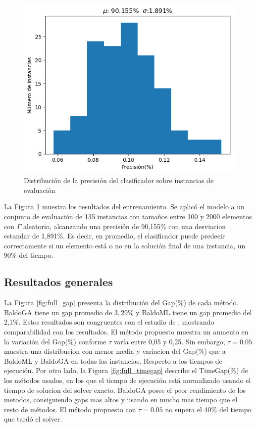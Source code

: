 \documentclass[spanish, a4paper, 12pt, openany,final]{book}
\begin{document}
\begin{figure}[h]
	\centering
			\includegraphics[scale=0.75]{graphs/training_performance.png}
	\caption{Distribución de la precisión del clasificador sobre instancias de evaluación}
	\label{fig:model_performance}
\end{figure}

La Figura \ref{fig:model_performance} muestra los resultados del entrenamiento. Se aplicó el modelo a un conjunto de evaluación de 135 instancias con tamaños entre 100 y 2000 elementos con $\Gamma$ aleatorio, alcanzando una precisión de 90,155\% con una desviacion estandar de 1,891\%. Es decir, en promedio, el clasificador puede predecir correctamente si un elemento está o no en la solución final de una instancia, un 90\% del tiempo.


\subsection*{Resultados generales}

La Figura \ref{fig:full_gap} presenta la distribución del Gap(\%) de cada método.
 BaldoGA tiene un gap promedio de $3,29\%$ y BaldoML tiene un gap promedio del 2,1\%. Estos resultados son congruentes con el estudio de \cite{baldo_polynomial_2023}, mostrando comparabilidad con los resultados. El método propuesto muestra un aumento en la variación del Gap(\%) conforme $\tau$ varía entre 0,05 y 0,25. Sin embargo, $\tau=0.05$ muestra una distribucion con menor media y variacion del Gap(\%) que a BaldoML y BaldoGA en todas las instancias. Respecto a los tiempos de ejecución. Por otro lado, la Figura \ref{fig:full_timegap} describe el TimeGap(\%) de los métodos usados, en los que el tiempo de ejecución está normalizado usando el tiempo de solucion del solver exacto. BaldoGA posee el peor rendimiento de los metodos, consiguiendo gaps mas altos y usando en mucho mas tiempo que el resto de métodos. El método propuesto con $\tau = 0.05$ no supera el 40\% del tiempo que tardó el solver.
\end{document}

